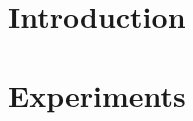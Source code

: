 \documentclass{report}
\begin{document}
%

\newpage

\tableofcontents

\chapter{Introduction}



\chapter{Experiments}


\end{document}
